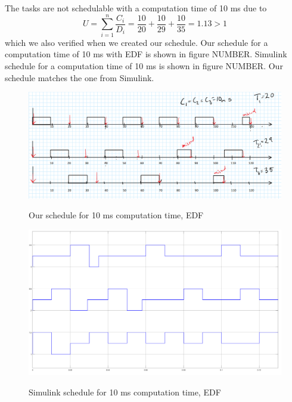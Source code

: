 \documentclass[12pt,a4paper]{article}
\begin{document}
The tasks are not schedulable with a computation time of 10 ms due to 
\begin{equation}
U = \sum\limits_{i=1}^n \frac{C_i}{D_i} = \frac{10}{20}+\frac{10}{29}+\frac{10}{35} = 1.13 > 1
\end{equation}
which we also verified when we created our schedule. Our schedule for a computation time of 10 ms with EDF is shown in figure NUMBER. Simulink schedule for a computation time of 10 ms is shown in figure NUMBER. Our schedule matches the one from Simulink.

\begin{center}
	\begin{figure}[H]
      \centering
	\includegraphics[scale=0.4]{ex6541.png}
	\label{fig:ex6541}
	\caption{Our schedule for 10 ms computation time, EDF}
	\end{figure}
\end{center}
\begin{center}
	\begin{figure}[H]
      \centering
	\includegraphics[scale=0.2]{ex6542.png}
	\label{fig:ex6542}
	\caption{Simulink schedule for 10 ms computation time, EDF}
	\end{figure}
\end{center}
\end{document}
